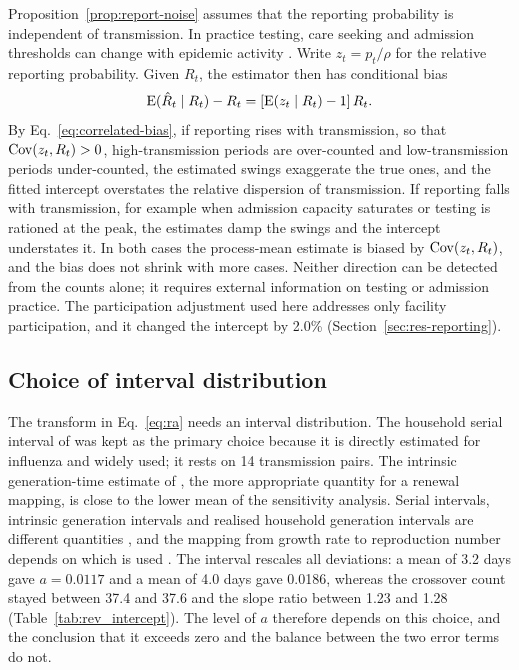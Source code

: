 Proposition~\ref{prop:report-noise} assumes that the reporting probability is independent of transmission. In practice testing, care seeking and admission thresholds can change with epidemic activity \citep{pitzer2021impact, sherratt2021exploring}. Write $z_t=p_t/\rho$ for the relative reporting probability. Given $R_t$, the estimator then has conditional bias
\begin{equation}
  \operatorname{E}(\hat R_t\mid R_t)-R_t=\left[\operatorname{E}(z_t\mid R_t)-1\right]R_t .
  \label{eq:correlated-bias}
\end{equation}
By Eq.~\eqref{eq:correlated-bias}, if reporting rises with transmission, so that $\operatorname{Cov}(z_t,R_t)>0$, high-transmission periods are over-counted and low-transmission periods under-counted, the estimated swings exaggerate the true ones, and the fitted intercept overstates the relative dispersion of transmission. If reporting falls with transmission, for example when admission capacity saturates or testing is rationed at the peak, the estimates damp the swings and the intercept understates it. In both cases the process-mean estimate is biased by $\operatorname{Cov}(z_t,R_t)$, and the bias does not shrink with more cases. Neither direction can be detected from the counts alone; it requires external information on testing or admission practice. The participation adjustment used here addresses only facility participation, and it changed the intercept by 2.0\% (Section~\ref{sec:res-reporting}).

\subsection{Choice of interval distribution}
\label{sec:disc-interval}

The transform in Eq.~\eqref{eq:ra} needs an interval distribution. The household serial interval of \citet{cowling2009estimation} was kept as the primary choice because it is directly estimated for influenza and widely used; it rests on 14 transmission pairs. The intrinsic generation-time estimate of \citet{chan2025estimating}, the more appropriate quantity for a renewal mapping, is close to the lower mean of the sensitivity analysis. Serial intervals, intrinsic generation intervals and realised household generation intervals are different quantities \citep{vink2014serial}, and the mapping from growth rate to reproduction number depends on which is used \citep{wallinga2007how}. The interval rescales all deviations: a mean of 3.2 days gave $a=0.0117$ and a mean of 4.0 days gave 0.0186, whereas the crossover count stayed between 37.4 and 37.6 and the slope ratio between 1.23 and 1.28 (Table~\ref{tab:rev_intercept}). The level of $a$ therefore depends on this choice, and the conclusion that it exceeds zero and the balance between the two error terms do not.

